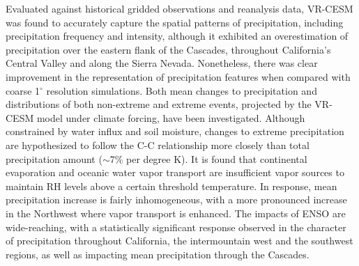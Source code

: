 Evaluated against historical gridded observations and reanalysis data, VR-CESM was found to accurately capture the spatial patterns of precipitation, including precipitation frequency and intensity, although it exhibited an overestimation of precipitation over the eastern flank of the Cascades, throughout California's Central Valley and along the Sierra Nevada.  Nonetheless, there was clear improvement in the representation of precipitation features when compared with coarse 1$^\circ$ resolution simulations. Both mean changes to precipitation and distributions of both non-extreme and extreme events, projected by the VR-CESM model under climate forcing, have been investigated.  Although constrained by water influx and soil moisture, changes to extreme precipitation are hypothesized to follow the C-C relationship more closely than total precipitation amount ($\sim$7\% per degree K). It is found that continental evaporation and oceanic water vapor transport are insufficient vapor sources to maintain RH levels above a certain threshold temperature. In response, mean precipitation increase is fairly inhomogeneous, with a more pronounced increase in the Northwest where vapor transport is enhanced. The impacts of ENSO are wide-reaching, with a statistically significant response observed in the character of precipitation throughout California, the intermountain west and the southwest regions, as well as impacting mean precipitation through the Cascades.



